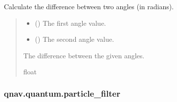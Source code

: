 \documentclass[letterpaper,10pt,english]{sphinxmanual}
\begin{document}
\begin{fulllineitems}
\label{\detokenize{modules/quantum/realistic:qnav.quantum.realistic.ang_diff}}
\pysigstartsignatures
{}
\pysigstopsignatures
\sphinxAtStartPar
Calculate the difference between two angles (in radians).
\begin{quote}\begin{description}
\begin{itemize}
\item {} 
\sphinxAtStartPar
{} () \textendash{} The first angle value.

\item {} 
\sphinxAtStartPar
{} () \textendash{} The second angle value.

\end{itemize}

\sphinxAtStartPar
The difference between the given angles.

\sphinxAtStartPar
float

\end{description}\end{quote}

\end{fulllineitems}


\sphinxstepscope


\subsubsection{qnav.quantum.particle\_filter}
\label{\detokenize{modules/quantum/particle_filter:module-qnav.quantum.particle_filter}}\label{\detokenize{modules/quantum/particle_filter:qnav-quantum-particle-filter}}\label{\detokenize{modules/quantum/particle_filter::doc}}
\end{document}
